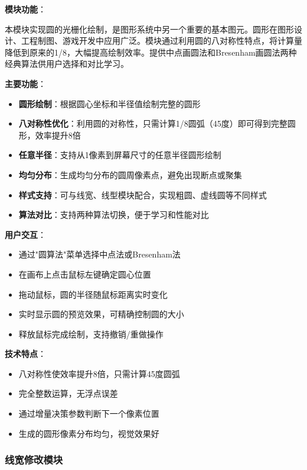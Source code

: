 \documentclass[12pt,a4paper]{article}
\begin{document}
\begin{tcolorbox}
\textbf{模块功能}：

本模块实现圆的光栅化绘制，是图形系统中另一个重要的基本图元。圆形在图形设计、工程制图、游戏开发中应用广泛。模块通过利用圆的八对称性特点，将计算量降低到原来的1/8，大幅提高绘制效率。提供中点画圆法和Bresenham画圆法两种经典算法供用户选择和对比学习。

\textbf{主要功能}：
\begin{itemize}
    \item \textbf{圆形绘制}：根据圆心坐标和半径值绘制完整的圆形
    \item \textbf{八对称性优化}：利用圆的对称性，只需计算1/8圆弧（45度）即可得到完整圆形，效率提升8倍
    \item \textbf{任意半径}：支持从1像素到屏幕尺寸的任意半径圆形绘制
    \item \textbf{均匀分布}：生成均匀分布的圆周像素点，避免出现断点或聚集
    \item \textbf{样式支持}：可与线宽、线型模块配合，实现粗圆、虚线圆等不同样式
    \item \textbf{算法对比}：支持两种算法切换，便于学习和性能对比
\end{itemize}

\textbf{用户交互}：
\begin{itemize}
    \item 通过"圆算法"菜单选择中点法或Bresenham法
    \item 在画布上点击鼠标左键确定圆心位置
    \item 拖动鼠标，圆的半径随鼠标距离实时变化
    \item 实时显示圆的预览效果，可精确控制圆的大小
    \item 释放鼠标完成绘制，支持撤销/重做操作
\end{itemize}

\textbf{技术特点}：
\begin{itemize}
    \item 八对称性使效率提升8倍，只需计算45度圆弧
    \item 完全整数运算，无浮点误差
    \item 通过增量决策参数判断下一个像素位置
    \item 生成的圆形像素分布均匀，视觉效果好
\end{itemize}
\end{tcolorbox}

\subsubsection{线宽修改模块}
\end{document}
